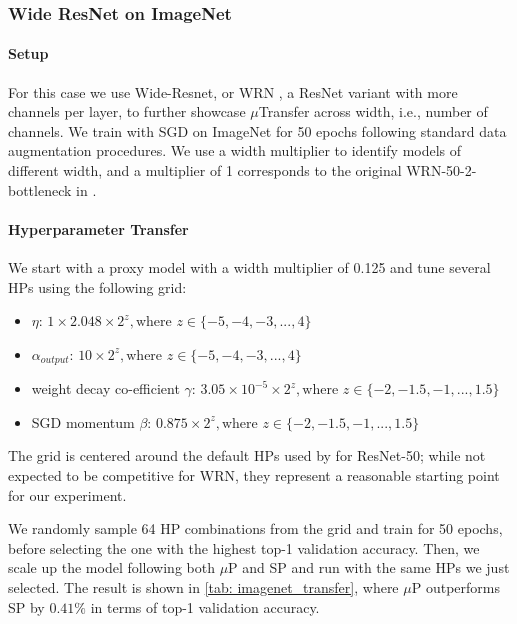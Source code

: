 \documentclass{article}
\theoremstyle{definition}
\begin{document}
\subsubsection{Wide ResNet on ImageNet}

\paragraph{Setup}
For this case we use Wide-Resnet, or WRN \citep{zagoruyko2017wide}, a ResNet variant with more channels per layer, to further showcase $\mu$Transfer across width, i.e., number of channels.
We train with SGD on ImageNet for 50 epochs following standard data augmentation procedures.
We use a width multiplier to identify models of different width, and a multiplier of 1 corresponds to the original WRN-50-2-bottleneck in \citep{zagoruyko2017wide}.

\paragraph{Hyperparameter Transfer}
We start with a proxy model with a width multiplier of 0.125 and tune several HPs using the following grid:
\begin{itemize}
    \item $\eta$: $1 \times 2.048 \times 2^z, \text{where } z\in \{-5, -4, -3, ..., 4\}$
    \item $\alpha_{output}$: $10 \times 2^z, \text{where } z\in \{-5, -4, -3, ..., 4\}$
    \item weight decay co-efficient $\gamma$: $3.05 \times 10^{-5} \times 2^z, \text{where } z\in\{-2, -1.5, -1, ..., 1.5\}$
    \item SGD momentum $\beta$: $0.875 \times 2^z, \text{where } z\in\{-2, -1.5, -1, ..., 1.5\}$
\end{itemize}

The grid is centered around the default HPs used by \citep{nvidia_resnet50} for ResNet-50; while not expected to be competitive for WRN, they represent a reasonable starting point for our experiment.

We randomly sample 64 HP combinations from the grid and train for 50 epochs, before selecting the one with the highest top-1 validation accuracy.
Then, we scale up the model following both $\mu$P and SP and run with the same HPs we just selected.
The result is shown in \cref{tab: imagenet_transfer}, where $\mu$P outperforms SP by $0.41\%$ in terms of top-1 validation accuracy.
\end{document}
